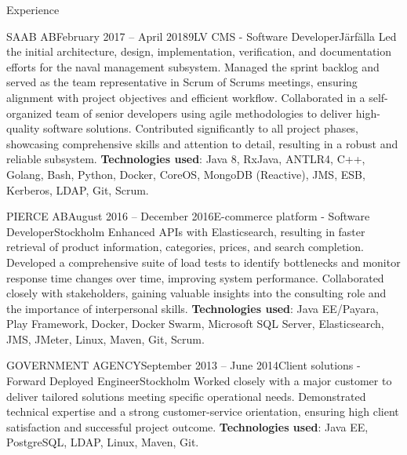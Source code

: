 \documentclass{resume}
\begin{document}
\begin{rSection}{Experience}
    \begin{rSubsection}{SAAB AB}{February 2017 -- April 2018}{9LV CMS - Software Developer}{Järfälla}
      \bItem Led the initial architecture, design, implementation, verification, and documentation efforts for the naval management subsystem.
      \bItem Managed the sprint backlog and served as the team representative in Scrum of Scrums meetings, ensuring alignment with project objectives and efficient workflow.
      \bItem Collaborated in a self-organized team of senior developers using agile methodologies to deliver high-quality software solutions.
      \bItem Contributed significantly to all project phases, showcasing comprehensive skills and attention to detail, resulting in a robust and reliable subsystem.
      \bItem \textbf{Technologies used}: Java 8, RxJava, ANTLR4, C++, Golang, Bash, Python, Docker, CoreOS, MongoDB (Reactive), JMS, ESB, Kerberos, LDAP, Git, Scrum.
    \end{rSubsection}

    \begin{rSubsection}{PIERCE AB}{August 2016 -- December 2016}{E-commerce platform - Software Developer}{Stockholm}
      \bItem Enhanced APIs with Elasticsearch, resulting in faster retrieval of product information, categories, prices, and search completion.
      \bItem Developed a comprehensive suite of load tests to identify bottlenecks and monitor response time changes over time, improving system performance.
      \bItem Collaborated closely with stakeholders, gaining valuable insights into the consulting role and the importance of interpersonal skills.
      \bItem \textbf{Technologies used}: Java EE/Payara, Play Framework, Docker, Docker Swarm, Microsoft SQL Server, Elasticsearch, JMS, JMeter, Linux, Maven, Git, Scrum.
    \end{rSubsection}

    \begin{rSubsection}{GOVERNMENT AGENCY}{September 2013 -- June 2014}{Client solutions - Forward Deployed Engineer}{Stockholm}
      \bItem Worked closely with a major customer to deliver tailored solutions meeting specific operational needs.
      \bItem Demonstrated technical expertise and a strong customer-service orientation, ensuring high client satisfaction and successful project outcome.
      \bItem \textbf{Technologies used}: Java EE, PostgreSQL, LDAP, Linux, Maven, Git.
    \end{rSubsection}


\end{rSection}
\end{document}
